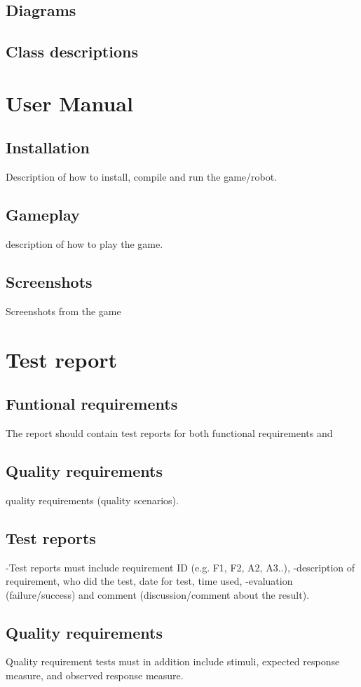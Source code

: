 \documentclass[12pt, a4paper]{article}
\begin{document}
\subsection{Diagrams}
\subsection{Class descriptions}

\section{User Manual}
\subsection{Installation}
Description of how to install, compile and run the game/robot.
\subsection{Gameplay}
description of how to play the game. 
\subsection{Screenshots}
Screenshots from the game

\section{Test report}
\subsection{Funtional requirements}
The report should contain test reports for both functional requirements and 
\subsection{Quality requirements}
quality requirements (quality scenarios).
\subsection{Test reports}
-Test reports must include requirement ID (e.g. F1, F2, A2, A3..), 
-description of requirement, who did the test, date for test, time used, 
-evaluation (failure/success) and comment (discussion/comment about the result). 
\subsection{Quality requirements}
Quality requirement tests must in addition include stimuli, expected 
response measure, and observed response measure. 
\end{document}
